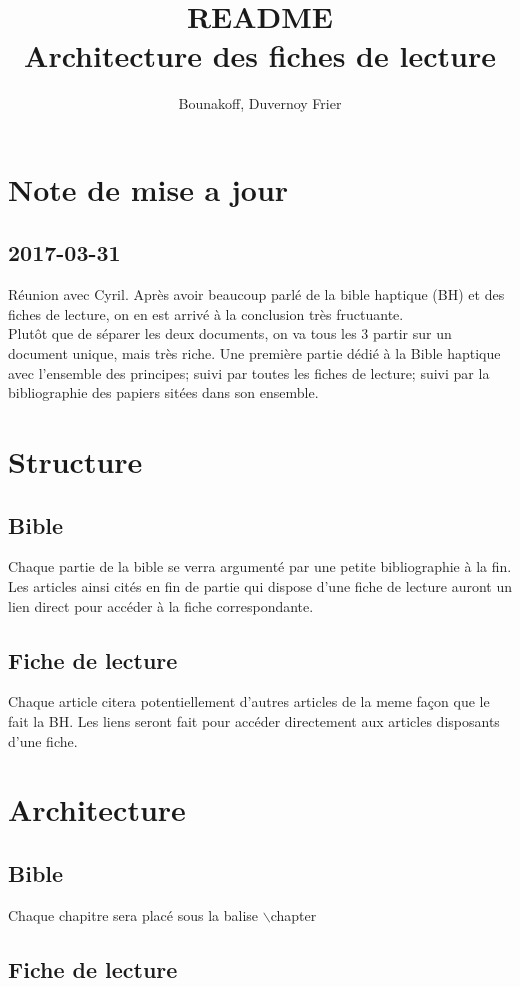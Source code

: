 \documentclass[11pt]{article} %
\title{README\\ Architecture des fiches de lecture}
\author{Bounakoff, Duvernoy Frier}
\begin{document}
\maketitle

\section{Note de mise a jour}
\subsection{2017-03-31}
R\'eunion avec Cyril. Apr\`es avoir beaucoup parl\'e de la bible haptique (BH) et des fiches de lecture, on en est arriv\'e \`a la conclusion tr\`es fructuante.\\
Plut\^ot que de s\'eparer les deux documents, on va tous les 3 partir sur un document unique, mais tr\`es riche.
Une premi\`ere partie d\'edi\'e \`a la Bible haptique avec l'ensemble des principes; suivi par toutes les fiches de lecture; suivi par la bibliographie des papiers sit\'ees dans son ensemble.\\


\section{Structure}
\subsection{Bible}
Chaque partie de la bible se verra argument\'e par une petite bibliographie \`a la fin. Les articles ainsi cit\'es en fin de partie qui dispose d'une fiche de lecture auront un lien direct pour acc\'eder \`a la fiche correspondante.\\


\subsection{Fiche de lecture}
Chaque article citera potentiellement d'autres articles de la meme fa\c con que le fait la BH. Les liens seront fait pour acc\'eder directement aux articles disposants d'une fiche.



\section{Architecture}
\subsection{Bible}
Chaque chapitre sera plac\'e sous la balise $\backslash$chapter

\subsection{Fiche de lecture}
\end{document}
